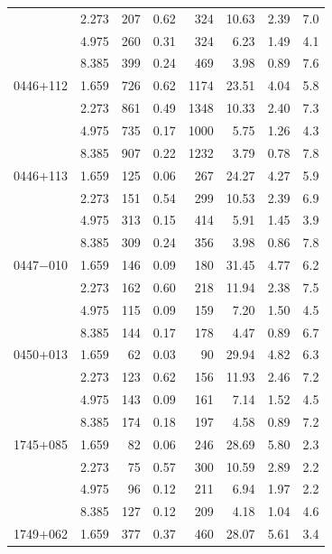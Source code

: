 \begin{longtable}{|c|c|r|c|r|r|r|r|}
           & 2.273 &   207 &  0.62 &   324 & 10.63 &  2.39 &   7.0 \\
           & 4.975 &   260 &  0.31 &   324 &  6.23 &  1.49 &   4.1 \\
           & 8.385 &   399 &  0.24 &   469 &  3.98 &  0.89 &   7.6 \\
0446$+$112 & 1.659 &   726 &  0.62 &  1174 & 23.51 &  4.04 &   5.8 \\
           & 2.273 &   861 &  0.49 &  1348 & 10.33 &  2.40 &   7.3 \\
           & 4.975 &   735 &  0.17 &  1000 &  5.75 &  1.26 &   4.3 \\
           & 8.385 &   907 &  0.22 &  1232 &  3.79 &  0.78 &   7.8 \\
0446$+$113 & 1.659 &   125 &  0.06 &   267 & 24.27 &  4.27 &   5.9 \\
           & 2.273 &   151 &  0.54 &   299 & 10.53 &  2.39 &   6.9 \\
           & 4.975 &   313 &  0.15 &   414 &  5.91 &  1.45 &   3.9 \\
           & 8.385 &   309 &  0.24 &   356 &  3.98 &  0.86 &   7.8 \\
0447$-$010 & 1.659 &   146 &  0.09 &   180 & 31.45 &  4.77 &   6.2 \\
           & 2.273 &   162 &  0.60 &   218 & 11.94 &  2.38 &   7.5 \\
           & 4.975 &   115 &  0.09 &   159 &  7.20 &  1.50 &   4.5 \\
           & 8.385 &   144 &  0.17 &   178 &  4.47 &  0.89 &   6.7 \\
0450$+$013 & 1.659 &    62 &  0.03 &    90 & 29.94 &  4.82 &   6.3 \\
           & 2.273 &   123 &  0.62 &   156 & 11.93 &  2.46 &   7.2 \\
           & 4.975 &   143 &  0.09 &   161 &  7.14 &  1.52 &   4.5 \\
           & 8.385 &   174 &  0.18 &   197 &  4.58 &  0.89 &   7.2 \\
1745$+$085 & 1.659 &    82 &  0.06 &   246 & 28.69 &  5.80 &   2.3 \\
           & 2.273 &    75 &  0.57 &   300 & 10.59 &  2.89 &   2.2 \\
           & 4.975 &    96 &  0.12 &   211 &  6.94 &  1.97 &   2.2 \\
           & 8.385 &   127 &  0.12 &   209 &  4.18 &  1.04 &   4.6 \\
1749$+$062 & 1.659 &   377 &  0.37 &   460 & 28.07 &  5.61 &   3.4 \\

\end{longtable}
